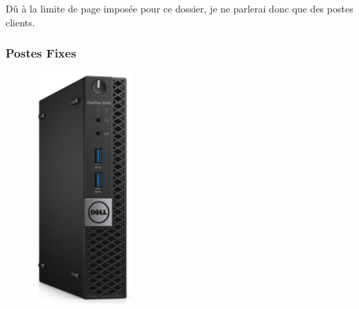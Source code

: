\documentclass[11pt,a4paper,twoside]{article}
\begin{document}
Dû à la limite de page imposée pour ce dossier, je ne parlerai donc que des postes clients.
\newpage

\newpage

\subsubsection{Postes Fixes}
\begin{figure}
\includegraphics[scale=0.4]{Ressources/Materiel/3040.png}\vspace{-2cm}
\end{figure}
\end{document}
